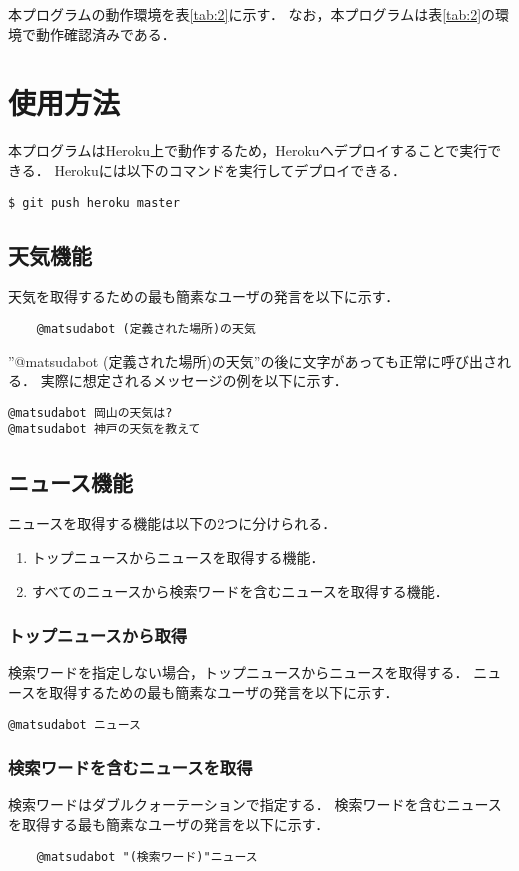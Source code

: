 \documentclass[12pt]{jsarticle}
\begin{document}
本プログラムの動作環境を表\ref{tab:2}に示す．
なお，本プログラムは表\ref{tab:2}の環境で動作確認済みである．
\section{使用方法}
本プログラムはHeroku上で動作するため，Herokuへデプロイすることで実行できる．
Herokuには以下のコマンドを実行してデプロイできる．
\begin{verbatim}
$ git push heroku master
\end{verbatim}

\subsection{天気機能}
天気を取得するための最も簡素なユーザの発言を以下に示す．
\begin{verbatim}
	@matsudabot (定義された場所)の天気
\end{verbatim}
''@matsudabot (定義された場所)の天気''の後に文字があっても正常に呼び出される．
実際に想定されるメッセージの例を以下に示す．
\begin{verbatim}
@matsudabot 岡山の天気は?
@matsudabot 神戸の天気を教えて
\end{verbatim}

\subsection{ニュース機能}
ニュースを取得する機能は以下の2つに分けられる．
\begin{enumerate}
\item トップニュースからニュースを取得する機能．
\item すべてのニュースから検索ワードを含むニュースを取得する機能．
\end{enumerate}
\subsubsection{トップニュースから取得}
検索ワードを指定しない場合，トップニュースからニュースを取得する．
ニュースを取得するための最も簡素なユーザの発言を以下に示す．
\begin{verbatim}
@matsudabot ニュース
\end{verbatim}
\subsubsection{検索ワードを含むニュースを取得}
検索ワードはダブルクォーテーションで指定する．
検索ワードを含むニュースを取得する最も簡素なユーザの発言を以下に示す．
\begin{verbatim}
	@matsudabot "(検索ワード)"ニュース
\end{verbatim}
\end{document}
